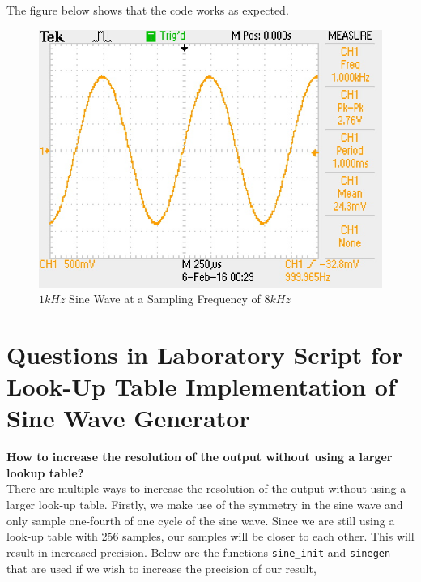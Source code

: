 \documentclass{article}
\begin{document}
The figure below shows that the code works as expected.


\begin{figure}[h]
    \centering{}
    \includegraphics[scale=0.7]{8000_1000.JPG}
    \caption{$1kHz$ Sine Wave at a Sampling Frequency of $8kHz$}
\end{figure}

\newpage
\section{Questions in Laboratory Script for Look-Up Table Implementation of Sine Wave Generator}

\textbf{How to increase the resolution of the output without using a larger lookup table?}\\


There are multiple ways to increase the resolution of the output without using a larger look-up table. Firstly, we make use of the symmetry in the sine wave and only sample one-fourth of one cycle of the sine wave. Since we are still using a look-up table with 256 samples, our samples will be closer to each other. This will result in increased precision. Below are the functions {\tt sine\_init} and {\tt sinegen} that are used if we wish to increase the precision of our result,\\
\end{document}
